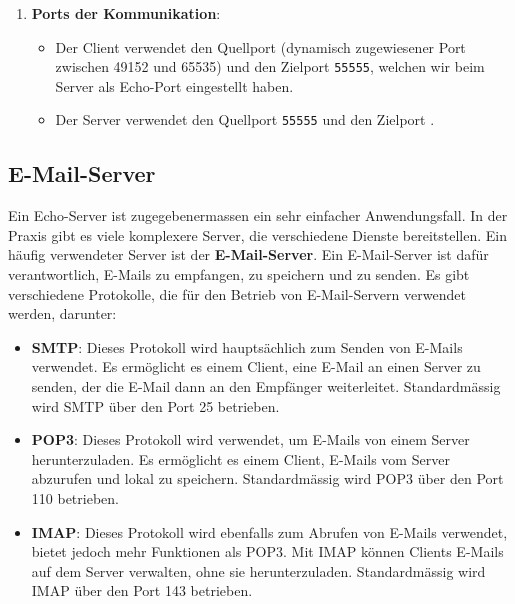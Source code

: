 \begin{myexercise}
\begin{myanswer}
\begin{enumerate}
\begin{enumerate}
		\end{enumerate}
			\item \textbf{Ports der Kommunikation}:
			\begin{itemize}
				\item Der Client verwendet den Quellport \texttt{\echoClientPort} (dynamisch zugewiesener Port zwischen 49152 und 65535) und den Zielport \texttt{55555}, welchen wir beim Server als Echo-Port eingestellt haben.
				\item Der Server verwendet den Quellport \texttt{55555} und den Zielport \texttt{\echoClientPort}.
			\end{itemize}
		\end{enumerate}
	\end{myanswer}
\end{myexercise}

\subsection{E-Mail-Server}
Ein Echo-Server ist zugegebenermassen ein sehr einfacher Anwendungsfall. In der Praxis gibt es viele komplexere Server, die verschiedene Dienste bereitstellen. Ein häufig verwendeter Server ist der \textbf{E-Mail-Server}. Ein E-Mail-Server ist dafür verantwortlich, E-Mails zu empfangen, zu speichern und zu senden. Es gibt verschiedene Protokolle, die für den Betrieb von E-Mail-Servern verwendet werden, darunter:
\begin{itemize}
	\item \textbf{\gls{SMTP}}: Dieses Protokoll wird hauptsächlich zum Senden von E-Mails verwendet. Es ermöglicht es einem Client, eine E-Mail an einen Server zu senden, der die E-Mail dann an den Empfänger weiterleitet. Standardmässig wird \gls{SMTP} über den Port 25 betrieben.
	\item \textbf{\gls{POP3}}: Dieses Protokoll wird verwendet, um E-Mails von einem Server herunterzuladen. Es ermöglicht es einem Client, E-Mails vom Server abzurufen und lokal zu speichern. Standardmässig wird \gls{POP3} über den Port 110 betrieben.
	\item \textbf{\gls{IMAP}}: Dieses Protokoll wird ebenfalls zum Abrufen von E-Mails verwendet, bietet jedoch mehr Funktionen als \gls{POP3}. Mit \gls{IMAP} können Clients E-Mails auf dem Server verwalten, ohne sie herunterzuladen. Standardmässig wird \gls{IMAP} über den Port 143 betrieben.
\end{itemize}

